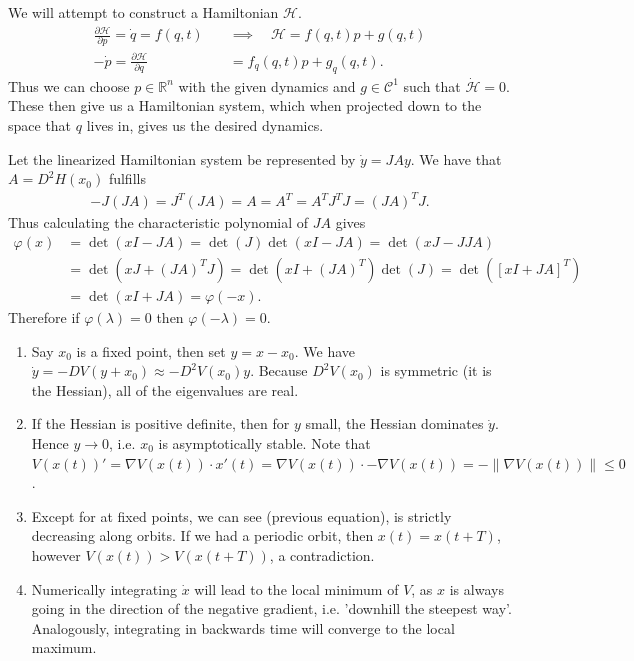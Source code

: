 \begin{solution}[8.4]
We will attempt to construct a Hamiltonian $\mathcal{H}$.
\begin{align}
	\frac{\partial \mathcal{H}}{\partial p} = \dot{q} = f(q,t) \quad &\implies \quad \mathcal{H}= f(q,t) p + g(q,t) \\
	-\dot{p} = \frac{\partial \mathcal{H}}{\partial q} &= f_q(q,t)p + g_q(q,t). 
\end{align}
Thus we can choose $p \in \mathbb{R}^n$ with the given dynamics and $g \in \mathcal{C}^1$ such that $\dot{\mathcal{H}} = 0$. These then give us a Hamiltonian system, which when projected down to the space that $q$ lives in, gives us the desired dynamics. 
\end{solution}

\begin{solution}[8.5]
Let the linearized Hamiltonian system be represented by $\dot{y} = JAy$. We have that $A=D^2H(x_0)$ fulfills 
\begin{align}
	-J(JA) = J^T (JA) = A = A^T = A^T J^T J =  (JA)^T J.
\end{align}
Thus calculating the characteristic polynomial of $JA$ gives
\begin{align}
	\varphi(x) &= \det (xI - JA) = \det(J) \det(xI-JA) = \det(xJ - JJA)\\ 
		   &= \det(xJ + (JA)^TJ) = \det(xI +(JA)^T)\det(J) = \det([xI + JA]^T)\\
		   &= \det(xI + JA) = \varphi(-x).
\end{align}
Therefore if $\varphi(\lambda) = 0$ then $\varphi(-\lambda)=0$.	
\end{solution}


\begin{solution}[8.6]
\begin{enumerate}
	\item Say $x_0$ is a fixed point, then set $y= x - x_0$. We have $\dot{y} = -DV(y+x_0) \approx -D^2V(x_0)y$. Because $D^2V(x_0)$ is symmetric (it is the Hessian), all of the eigenvalues are real.
	\item If the Hessian is positive definite, then for $y$ small, the Hessian dominates $\dot{y}$. Hence $y \to 0$, i.e. $x_0$ is asymptotically stable. Note that $V(x(t))' = \nabla V(x(t)) \cdot x'(t) = \nabla V(x(t)) \cdot -\nabla V(x(t)) = - \| \nabla V(x(t)) \| \leq 0$.
	\item Except for at fixed points, we can see (previous equation), is strictly decreasing along orbits. If we had a periodic orbit, then $x(t) = x(t+T)$, however $V(x(t)) > V(x(t+T))$, a contradiction. 
	\item Numerically integrating $\dot{x}$ will lead to the local minimum of $V$, as $x$ is always going in the direction of the negative gradient, i.e. 'downhill the steepest way'. Analogously, integrating in backwards time will converge to the local maximum.
\end{enumerate}
\end{solution}

